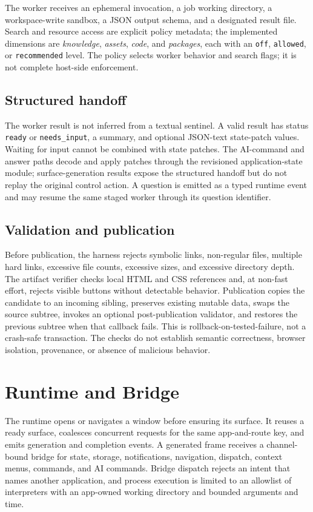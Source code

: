 \documentclass[11pt]{article}
\begin{document}
The worker receives an ephemeral invocation, a job working directory, a workspace-write sandbox, a JSON output schema, and a designated result file. Search and resource access are explicit policy metadata; the implemented dimensions are \textit{knowledge}, \textit{assets}, \textit{code}, and \textit{packages}, each with an \texttt{off}, \texttt{allowed}, or \texttt{recommended} level. The policy selects worker behavior and search flags; it is not complete host-side enforcement.

\subsection{Structured handoff}
The worker result is not inferred from a textual sentinel. A valid result has status \texttt{ready} or \texttt{needs\_input}, a summary, and optional JSON-text state-patch values. Waiting for input cannot be combined with state patches. The AI-command and answer paths decode and apply patches through the revisioned application-state module; surface-generation results expose the structured handoff but do not replay the original control action. A question is emitted as a typed runtime event and may resume the same staged worker through its question identifier.

\subsection{Validation and publication}
Before publication, the harness rejects symbolic links, non-regular files, multiple hard links, excessive file counts, excessive sizes, and excessive directory depth. The artifact verifier checks local HTML and CSS references and, at non-fast effort, rejects visible buttons without detectable behavior. Publication copies the candidate to an incoming sibling, preserves existing mutable data, swaps the source subtree, invokes an optional post-publication validator, and restores the previous subtree when that callback fails. This is rollback-on-tested-failure, not a crash-safe transaction. The checks do not establish semantic correctness, browser isolation, provenance, or absence of malicious behavior.

\section{Runtime and Bridge}
The runtime opens or navigates a window before ensuring its surface. It reuses a ready surface, coalesces concurrent requests for the same app-and-route key, and emits generation and completion events. A generated frame receives a channel-bound bridge for state, storage, notifications, navigation, dispatch, context menus, commands, and AI commands. Bridge dispatch rejects an intent that names another application, and process execution is limited to an allowlist of interpreters with an app-owned working directory and bounded arguments and time.
\end{document}
